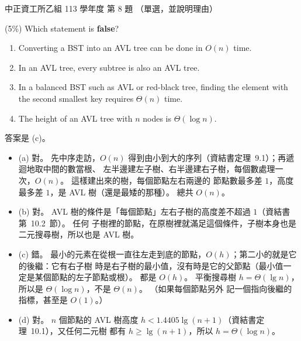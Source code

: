 \begin{pastexam}[label={px:ccu-113-csb-04}]{中正資工所乙組 113 學年度 第 8 題}
（單選，並說明理由）

(5\%) Which statement is \textbf{false}?
\begin{enumerate}[label=(\alph*),itemsep=0pt]
\item Converting a BST into an AVL tree can be done in $O(n)$ time.
\item In an AVL tree, every subtree is also an AVL tree.
\item In a balanced BST such as AVL or red-black tree, finding the element with the second smallest
key requires $\Theta(n)$ time.
\item The height of an AVL tree with $n$ nodes is $\Theta(\log n)$.
\end{enumerate}
\end{pastexam}

\begin{pastsoln}
答案是 (c)。
\begin{itemize}
\item (a) 對。 先中序走訪，$O(n)$ 得到由小到大的序列（資結書定理~9.1）；再遞迴地取中間的數當根、
左半邊建左子樹、右半邊建右子樹，每個數處理一次，$O(n)$。 這樣建出來的樹，每個節點左右兩邊的
節點數最多差 $1$，高度最多差 $1$，是 AVL 樹（還是最矮的那種）。 總共 $O(n)$。
\item (b) 對。 AVL 樹的條件是「每個節點」左右子樹的高度差不超過 $1$（資結書第~10.2~節）。 任何
子樹裡的節點，在原樹裡就滿足這個條件，子樹本身也是二元搜尋樹，所以也是 AVL 樹。
\item (c) 錯。 最小的元素在從根一直往左走到底的節點，$O(h)$；第二小的就是它的後繼：它有右子樹
時是右子樹的最小值，沒有時是它的父節點（最小值一定是某個節點的左子節點或根）。 都是 $O(h)$。
平衡搜尋樹 $h = \Theta(\lg n)$，所以是 $\Theta(\log n)$，不是 $\Theta(n)$。 （如果每個節點另外
記一個指向後繼的指標，甚至是 $O(1)$。）
\item (d) 對。 $n$ 個節點的 AVL 樹高度 $h < 1.4405 \lg(n + 1)$（資結書定理~10.1），又任何二元樹
都有 $h \ge \lg(n + 1)$，所以 $h = \Theta(\log n)$。
\end{itemize}
\end{pastsoln}
